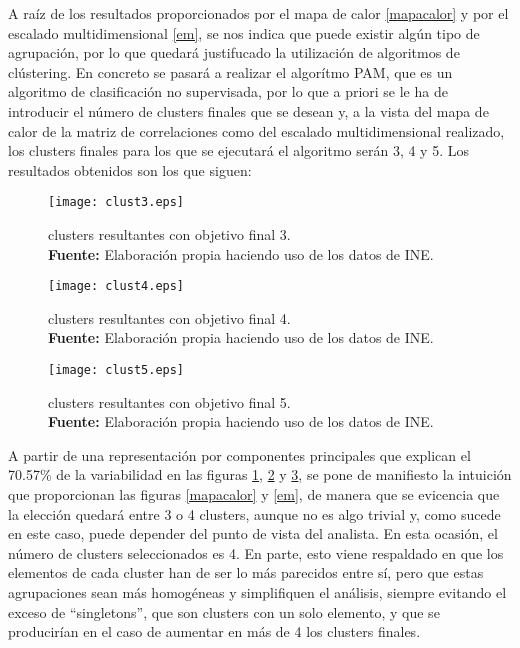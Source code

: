 \documentclass{article}
\begin{document}
A raíz de los resultados proporcionados por el mapa de calor \ref{mapacalor} y por el escalado multidimensional \ref{em}, se nos indica que puede existir algún tipo de agrupación, por lo que quedará justifucado la utilización de algoritmos de clústering. En concreto se pasará a realizar el algorítmo PAM, que es un algoritmo de clasificación no supervisada, por lo que a priori se le ha de introducir el número de clusters finales que se desean y, a la vista del mapa de calor de la matriz de correlaciones como del escalado multidimensional realizado, los clusters finales para los que se ejecutará el algoritmo serán 3, 4 y 5. Los resultados obtenidos son los que siguen:

\begin{figure}[H]
\centering
\texttt{[image: clust3.eps]}
\caption{\centering clusters resultantes con objetivo final 3. \\ \textbf{Fuente:} Elaboración propia haciendo uso de los datos de INE.}
\label{clust3}
\end{figure}

\begin{figure}[H]
\centering
\texttt{[image: clust4.eps]}
\caption{\centering clusters resultantes con objetivo final 4. \\ \textbf{Fuente:} Elaboración propia haciendo uso de los datos de INE.}
\label{clust4}
\end{figure}

\begin{figure}[H]
\centering
\texttt{[image: clust5.eps]}
\caption{\centering clusters resultantes con objetivo final 5. \\ \textbf{Fuente:} Elaboración propia haciendo uso de los datos de INE.}
\label{clust5}
\end{figure}



A partir de una representación por componentes principales que explican el 70.57\% de la variabilidad en las figuras \ref{clust3}, \ref{clust4} y \ref{clust5}, se pone de manifiesto la intuición que proporcionan las figuras  \ref{mapacalor} y \ref{em}, de manera que se evicencia que la elección quedará entre 3 o 4 clusters, aunque no es algo trivial y, como sucede en este caso, puede depender del punto de vista del analista. En esta ocasión, el número de clusters seleccionados es 4. En parte, esto viene respaldado en que los elementos de cada cluster han de ser lo más parecidos entre sí, pero que estas agrupaciones sean más homogéneas y simplifiquen el análisis, siempre evitando el exceso de ``singletons'', que son clusters con un solo elemento, y que se producirían en el caso de aumentar en más de 4 los clusters finales.
\end{document}
